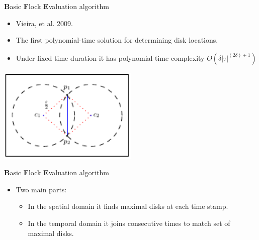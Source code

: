 \documentclass{beamer}
\begin{document}
    \begin{frame}{\textbf{B}asic \textbf{F}lock \textbf{E}valuation algorithm}
        \begin{itemize}
            \item Vieira, et al. 2009.
            \item The first polynomial-time solution for determining disk locations.
            \item Under fixed time duration it has polynomial time complexity $O(\delta|\tau|^{(2\delta) + 1})$
        \end{itemize}
        \vspace{0.25cm}

        \centering
        \includegraphics[width=0.5\textwidth]{figures/theorem}

    \end{frame}

    \begin{frame}{\textbf{B}asic \textbf{F}lock \textbf{E}valuation algorithm}
        \begin{itemize}
            \item Two main parts:
            \begin{itemize}
                \item In the spatial domain it finds maximal disks at each time stamp.
                \item In the temporal domain it joins consecutive times to match set of maximal disks.
            \end{itemize}
        \end{itemize}
    \end{frame}
\end{document}
